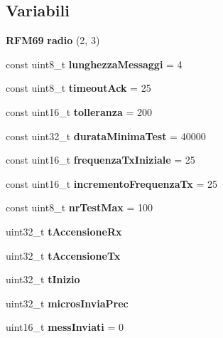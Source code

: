 \subsection*{Variabili}
\begin{DoxyCompactItemize}
\item 
\mbox{\label{_test__collisioni__master_8cpp_a2df6ba949dd4ce1e7ee9a96a19aef0fd}} 
\textbf{ R\+F\+M69} {\bfseries radio} (2, 3)
\item 
\mbox{\label{_test__collisioni__master_8cpp_a8cfea90381d7fadea030081a4e76880f}} 
const uint8\+\_\+t {\bfseries lunghezza\+Messaggi} = 4
\item 
\mbox{\label{_test__collisioni__master_8cpp_afd18a66052dc75024e8cae2c4e6d2f2c}} 
const uint8\+\_\+t {\bfseries timeout\+Ack} = 25
\item 
\mbox{\label{_test__collisioni__master_8cpp_a5a2bddb650a1874c43892279cec58148}} 
const uint16\+\_\+t {\bfseries tolleranza} = 200
\item 
\mbox{\label{_test__collisioni__master_8cpp_a91424d5a398d53cb74dcf44991723d9f}} 
const uint32\+\_\+t {\bfseries durata\+Minima\+Test} = 40000
\item 
\mbox{\label{_test__collisioni__master_8cpp_aa756f604141526ce92dd3630d5f2c398}} 
const uint16\+\_\+t {\bfseries frequenza\+Tx\+Iniziale} = 25
\item 
\mbox{\label{_test__collisioni__master_8cpp_ae4278c642aa97a2ef3b793c505553689}} 
const uint16\+\_\+t {\bfseries incremento\+Frequenza\+Tx} = 25
\item 
\mbox{\label{_test__collisioni__master_8cpp_ae81eb299eb6cd9607138ea4157b70fc1}} 
const uint8\+\_\+t {\bfseries nr\+Test\+Max} = 100
\item 
\mbox{\label{_test__collisioni__master_8cpp_a05c81c9373c9a980ebfd57611013d17a}} 
uint32\+\_\+t {\bfseries t\+Accensione\+Rx}
\item 
\mbox{\label{_test__collisioni__master_8cpp_ad95c317a1d748e767db7893c59224c6e}} 
uint32\+\_\+t {\bfseries t\+Accensione\+Tx}
\item 
\mbox{\label{_test__collisioni__master_8cpp_a81a0d1f62dcc7fad7b79a8054dd75a7b}} 
uint32\+\_\+t {\bfseries t\+Inizio}
\item 
\mbox{\label{_test__collisioni__master_8cpp_a94269026a3225b603f8571c95818422e}} 
uint32\+\_\+t {\bfseries micros\+Invia\+Prec}
\item 
\mbox{\label{_test__collisioni__master_8cpp_acde8756bb0569399c05b597b356657a4}} 
uint16\+\_\+t {\bfseries mess\+Inviati} = 0
\item 

\end{DoxyCompactItemize}
